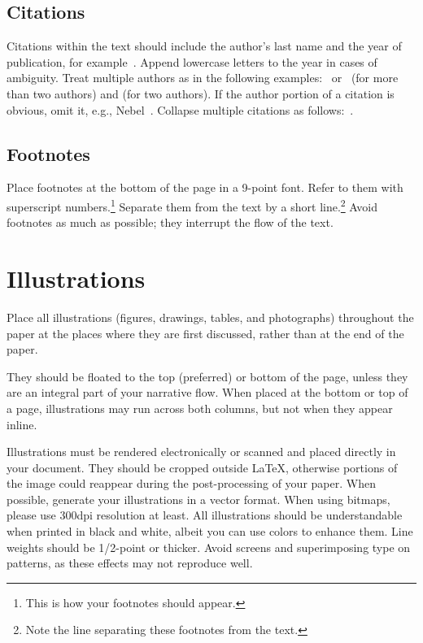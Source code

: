 \documentclass{article}
\begin{document}
\subsection{Citations}

Citations within the text should include the author's last name and
the year of publication, for example~\cite{gottlob:nonmon}.  Append
lowercase letters to the year in cases of ambiguity.  Treat multiple
authors as in the following examples:~\cite{abelson-et-al:scheme}
or~\cite{bgf:Lixto} (for more than two authors) and
\cite{brachman-schmolze:kl-one} (for two authors).  If the author
portion of a citation is obvious, omit it, e.g.,
Nebel~.  Collapse multiple citations as
follows:~\cite{gls:hypertrees,levesque:functional-foundations}.
\nocite{abelson-et-al:scheme}
\nocite{bgf:Lixto}
\nocite{brachman-schmolze:kl-one}
\nocite{gottlob:nonmon}
\nocite{gls:hypertrees}
\nocite{levesque:functional-foundations}
\nocite{levesque:belief}
\nocite{nebel:jair-2000}

\subsection{Footnotes}

Place footnotes at the bottom of the page in a 9-point font.  Refer to
them with superscript numbers.\footnote{This is how your footnotes
	should appear.} Separate them from the text by a short
line.\footnote{Note the line separating these footnotes from the
	text.} Avoid footnotes as much as possible; they interrupt the flow of
the text.

\section{Illustrations}

Place all illustrations (figures, drawings, tables, and photographs)
throughout the paper at the places where they are first discussed,
rather than at the end of the paper.

They should be floated to the top (preferred) or bottom of the page,
unless they are an integral part
of your narrative flow. When placed at the bottom or top of
a page, illustrations may run across both columns, but not when they
appear inline.

Illustrations must be rendered electronically or scanned and placed
directly in your document. They should be cropped outside \LaTeX{},
otherwise portions of the image could reappear during the post-processing of your paper.
When possible, generate your illustrations in a vector format.
When using bitmaps, please use 300dpi resolution at least.
All illustrations should be understandable when printed in black and
white, albeit you can use colors to enhance them. Line weights should
be 1/2-point or thicker. Avoid screens and superimposing type on
patterns, as these effects may not reproduce well.
\end{document}
